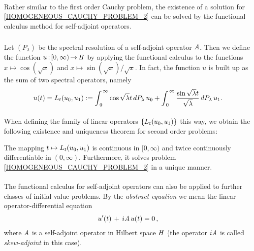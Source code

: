 \documentclass[11pt,twoside]{article}
\begin{document}
\paragraph*{}
Rather similar to the first order Cauchy problem,
the existence of a solution for \eqref{HOMOGENEOUS_CAUCHY_PROBLEM_2}
can be solved by 
the functional calculus method for self-adjoint operators.

\subparagraph*{}
Let $(P_{\lambda})$ be the spectral resolution
of a self-adjoint operator $\mathit{A}$.
Then we define the function $u{\,:\,}[0,\infty) {\,\to\,} \mathit{H}$
by applying the functional calculus to the functions
$x \mapsto \cos(\sqrt{x})$ and
$x \mapsto \sin(\sqrt{x})/\sqrt{x}$.
In fact, the function $u$ is built up 
as the sum of two spectral operators, namely
\begin{equation}\label{SPECTRAL_OPERATOR_II}
u(t)
= 
{L}_t(u_0,u_1)
:= 
\int_{\,0}^{\,\infty} \cos{\sqrt{\lambda}t} \, dP_{\lambda} \, u_0
+
\int_{\,0}^{\,\infty} \frac{\sin{\sqrt{\lambda}t}}{\sqrt{\lambda}}
\, dP_{\lambda} \, u_1.
\end{equation}

\paragraph*{}
When defining the family of linear operators $\{{L}_t(u_0,u_1)\}$ this way,
we obtain the following existence and uniqueness theorem
for second order problems:

\begin{theorem}\label{EXISTENCE_THEOREM_FOR_ABSTRACT_WAVE_EQUATION}
The mapping $t \mapsto {L}_t(u_0,u_1)$ is continuous in $[0,\infty)$
and twice continuously differentiable in $(0,\infty)$.
Furthermore,
it solves problem \eqref{HOMOGENEOUS_CAUCHY_PROBLEM_2} in a unique manner.
\end{theorem}

%

\paragraph*{}
The functional calculus for self-adjoint operators
can also be applied to further classes of initial-value problems.
By the \textit{abstract {\SCHROEDINGER} equation}
we mean the linear operator-differential equation
\begin{equation}\label{ABSTRACT_SCHROEDINGER_EQUATION}
u'(t) \, + \, i \mathit{A} \, u(t) = 0\,,
\end{equation}
where $\mathit{A}$ is a self-adjoint operator in Hilbert space $\mathit{H}$
(the operator $i \mathit{A}$ is called \textit{skew-adjoint} in this case).
\end{document}
